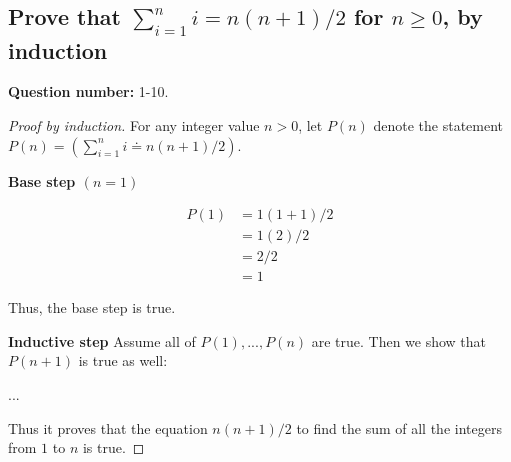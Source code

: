\subsection{Prove that $\sum_{i=1}^{n} i = n(n+1)/2$ for $n \geq 0$, by induction}
  \textbf{Question number:} 1-10.

  \begin{proof}[Proof by induction]

    For any integer value $n > 0$, let $P(n)$ denote the statement $P(n) = (\sum_{i=1}^n i \doteq n(n+1)/2)$.

    \textbf{Base step $(n=1)$}

    \begin{align}
      P(1) &= 1(1+1)/2\\
           &= 1(2)/2\\
           &= 2/2\\
           &= 1
    \end{align}

    Thus, the base step is true.

    \textbf{Inductive step}
    Assume all of $P(1), ..., P(n)$ are true. Then we show that $P(n+1)$ is true as well:

    ...

    Thus it proves that the equation $n(n+1)/2$ to find the sum of all the
    integers from $1$ to $n$ is true.
    \qedhere
  \end{proof}
